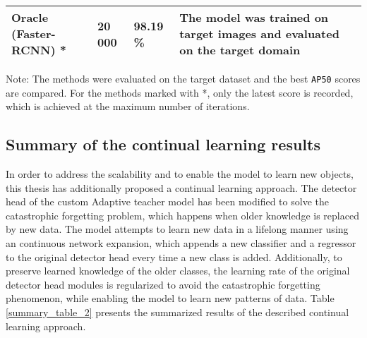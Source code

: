 \begin{table}
\begin{tabularx}{0.95\textwidth}{|X|X|X|X|}
        \hline
        Oracle (Faster-RCNN) \cite{ima} * & 20 000 & 98.19 \% & \multicolumn{1}{m{3cm}|}{The model was trained on target images and evaluated on the target domain} \\
        \hline
\end{tabularx}
\begin{tablenotes}
      \small
      \item Note: The methods were evaluated on the target dataset and the best \texttt{AP50} scores are compared. For the methods marked with *, only the latest score is recorded, which is achieved at the maximum number of  iterations. 
    \end{tablenotes}
\end{table}
\FloatBarrier 

\subsection{Summary of the continual learning results}

In order to address the scalability and to enable the model to learn new objects, this thesis has additionally proposed a continual learning approach. The detector head of the custom Adaptive teacher model has been modified to solve the catastrophic forgetting problem, which happens when older knowledge is replaced by new data. The model attempts to learn new data in a lifelong manner using an continuous network expansion, which appends a new classifier and a regressor to the original detector head every time a new class is added. Additionally, to preserve learned knowledge of the older classes, the learning rate of the original detector head modules is regularized to avoid the catastrophic forgetting phenomenon, while enabling the model to learn new patterns of data. Table \ref{summary_table_2} presents the summarized results of the described continual learning approach.  



